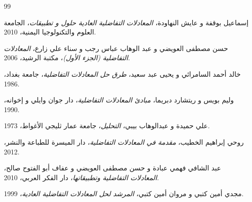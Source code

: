 \begin{thebibliography}{99}
	
	إسماعيل بوقفة و عايش النهاودة،
	\textit{المعادلات التفاضلية العادية حلول و تطبيقات}،
	الجامعة العلوم والتكنولوجيا اليمنية،
	2010.
	
	حسن مصطفى العويضي و عبد الوهاب عباس رجب و سناء علي زارع،
	\textit{المعادلات التفاضلية (الجزء الأول)}،
	مكتبة الرشيد،
	2006.
	
خالد أحمد السامرائي و يحيى عبد سعيد،
\textit{طرق حل المعادلات التفاضلية}،
جامعة بغداد،
1986.

وليم بويس و ريتشارد دبريما،
\textit{مبادئ المعادلات التفاضلية}،
دار جوان وايلي و إخوانه،
1990.

علي حميدة و عبدالوهاب بيبي،
\textit{التحليل}،
جامعة عمار ثليجي الأغواط،
1973.

روحي إبراهيم الخطيب،
\textit{مقدمة في المعادلات التفاضلية}،
دار الميسرة للطباعة والنشر،
2012.

عبد الشافي فهمي عبادة و حسن مصطفى العويضي و عفاف أبو الفتوح صالح،
\textit{المعادلات التفاضلية وتطبيقاتها}،
دار الفكر العربي،
2010.

مجدي أمين كتبي و مروان أمين كتبي،
\textit{المرشد لحل المعادلات التفاضلية العادية}،
1999.

\end{thebibliography}